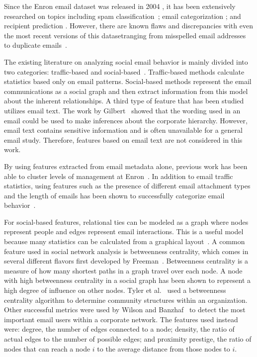 \documentclass[10pt,twocolumn,conference]{IEEEtran}
\begin{document}
Since the Enron email dataset was released in 2004 \cite{klimt_introducing_2004}, it has been extensively researched on topics including spam classification~\cite{martin_analyzing_2005}; email categorization \cite{he_novel_2014}; and recipient prediction \cite{sofershtein_predicting_2015}.
However, there are known flaws and discrepancies with even the most recent versions of this dataset\textemdash{}ranging from misspelled email addresses~\cite{nordbo_data_2014} to duplicate emails~\cite{waterman_big_2014}.

The existing literature on analyzing social email behavior is mainly divided into two categories: traffic-based and social-based~\cite{tang_email_2013}.
Traffic-based methods calculate statistics based only on email patterns.
Social-based methods represent the email communications as a social graph and then extract information from this model about the inherent relationships.
A third type of feature that has been studied utilizes email text.
The work by Gilbert~\cite{gilbert2012phrases} showed that the wording used in an email could be used to make inferences about the corporate hierarchy.
However, email text contains sensitive information and is often unavailable for a general email study.
Therefore, features based on email text are not considered in this work.

By using features extracted from email metadata alone, previous work has been able to cluster levels of management at Enron~\cite{yelupula_social_2008}.
In addition to email traffic statistics, using features such as the presence of different email attachment types and the length of emails has been shown to successfully categorize email behavior~\cite{martin_analyzing_2005}.

For social-based features, relational ties can be modeled as a graph where nodes represent people and edges represent email interactions.
This is a useful model because many statistics can be calculated from a graphical layout~\cite{wasserman_social_1994}.
A common feature used in social network analysis is betweenness centrality, which comes in several different flavors first developed by Freeman~\cite{freeman_set_1977}.
Betweenness centrality is a measure of how many shortest paths in a graph travel over each node.
A node with high betweenness centrality in a social graph has been shown to represent a high degree of influence on other nodes.
Tyler et al.~\cite{tyler_email_2003} used a betweenness centrality algorithm to determine community structures within an organization.
Other successful metrics were used by Wilson and Banzhaf~\cite{wilson_discovery_2009} to detect the most important email users within a corporate network.
The features used instead were: degree, the number of edges connected to a node; density, the ratio of actual edges to the number of possible edges; and proximity prestige, the ratio of nodes that can reach a node $i$ to the average distance from those nodes to $i$.
\end{document}
